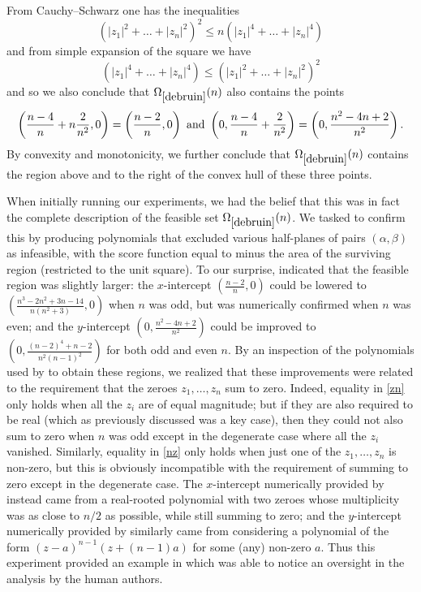 From Cauchy--Schwarz one has the inequalities
\begin{equation}\label{zn}
 (|z_1|^2 + \dots + |z_n|^2)^2 \leq n (|z_1|^4 + \dots + |z_n|^4)
\end{equation}
and from simple expansion of the square we have
\begin{equation}\label{nz}
 (|z_1|^4 + \dots + |z_n|^4) \leq (|z_1|^2 + \dots + |z_n|^2)^2
\end{equation}
and so we also conclude that $\Omega_{\ref{debruin}}(n)$ also contains the points
$$\left(\frac{n-4}{n} + n \frac{2}{n^2}, 0\right) = \left(\frac{n-2}{n}, 0\right) \hbox{ and }
\left(0, \frac{n-4}{n} + \frac{2}{n^2}\right) = \left(0, \frac{n^2-4n+2}{n^2}\right).
$$
By convexity and monotonicity, we further conclude that $\Omega_{\ref{debruin}}(n)$ contains the region above and to the right of the convex hull of these three points.


When initially running our experiments, we had the belief that this was in fact the complete description of the feasible set $\Omega_{\ref{debruin}}(n)$.  We tasked \AlphaEvolve to confirm this by producing polynomials that excluded various half-planes of pairs $(\alpha,\beta)$ as infeasible, with the score function equal to minus the area of the surviving region (restricted to the unit square).  To our surprise, \AlphaEvolve indicated that the feasible region was slightly larger: the $x$-intercept $(\frac{n-2}{n}, 0)$ could be lowered to $(\frac{n^3-2n^2+3n-14}{n(n^2+3)},0)$ when $n$ was odd, but was numerically confirmed when $n$ was even; and the $y$-intercept
$(0, \frac{n^2-4n+2}{n^2})$ could be improved to $(0, \frac{(n-2)^4 + n-2}{n^2 (n-1)^2})$ for both odd and even $n$.  By an inspection of the polynomials used by \AlphaEvolve to obtain these regions, we realized that these improvements were related to the requirement that the zeroes $z_1,\dots,z_n$  sum to zero.  Indeed, equality in \eqref{zn} only holds when all the $z_i$ are of equal magnitude; but if they are also required to be real (which as previously discussed was a key case), then they could not also sum to zero when $n$ was odd except in the degenerate case where all the $z_i$ vanished.  Similarly, equality in \eqref{nz} only holds when just one of the $z_1,\dots,z_n$ is non-zero, but this is obviously incompatible with the requirement of summing to zero except in the degenerate case.  The $x$-intercept numerically provided by \AlphaEvolve  instead came from a real-rooted polynomial with two zeroes whose multiplicity was as close to $n/2$ as possible, while still summing to zero; and the $y$-intercept numerically provided by \AlphaEvolve similarly came from considering a polynomial of the form $(z-a)^{n-1} (z+(n-1)a)$ for some (any) non-zero $a$.  Thus this experiment provided an example in which \AlphaEvolve was able to notice an oversight in the analysis by the human authors.

